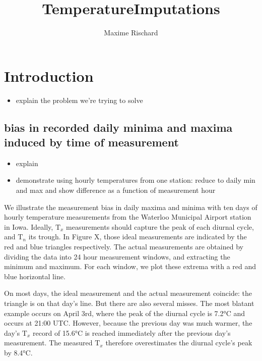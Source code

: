\documentclass[letter]{article}
\title{TemperatureImputations}
\author{Maxime Rischard}
\providecommand{\tightlist}{%
      \setlength{\itemsep}{0pt}\setlength{\parskip}{0pt}}
\newcommand{\T}{\mathrm{T}}
\newcommand{\Tn}{\T_{n}}
\newcommand{\Tx}{\T_{x}}
\providecommand{\tightlist}{%
  	  \setlength{\itemsep}{0pt}\setlength{\parskip}{0pt}}
\begin{document}
    
    
    
    \maketitle
    
    
	\tableofcontents


    







    	\section{Introduction}\label{introduction}

\begin{itemize}
\tightlist
\item
  explain the problem we're trying to solve
\end{itemize}

\subsection{bias in recorded daily minima and maxima induced by time of
measurement}\label{bias-in-recorded-daily-minima-and-maxima-induced-by-time-of-measurement}

\begin{itemize}
\tightlist
\item
  explain
\item
  demonstrate using hourly temperatures from one station: reduce to
  daily min and max and show difference as a function of measurement
  hour
\end{itemize}
    


    	We illustrate the measurement bias in daily maxima and minima with ten
days of hourly temperature measurements from the Waterloo Municipal
Airport station in Iowa. Ideally, \(\Tx\) measurements should capture
the peak of each diurnal cycle, and \(\Tn\) its trough. In Figure X,
those ideal measurements are indicated by the red and blue triangles
respectively. The actual measurements are obtained by dividing the data
into 24 hour measurement windows, and extracting the minimum and
maximum. For each window, we plot these extrema with a red and blue
horizontal line.

On most days, the ideal measurement and the actual measurement coincide:
the triangle is on that day's line. But there are also several misses.
The most blatant example occurs on April 3rd, where the peak of the
diurnal cycle is 7.2°C and occurs at 21:00 UTC. However, because the
previous day was much warmer, the day's \(\Tx\) record of 15.6°C is
reached immediately after the previous day's measurement. The measured
\(\Tx\) therefore overestimates the diurnal cycle's peak by 8.4°C.
    
\end{document}
